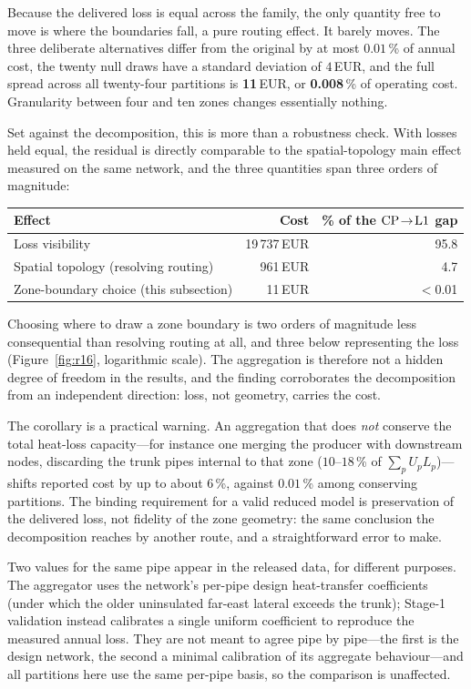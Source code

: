 Because the delivered loss is equal across the family, the only quantity free to move is
where the boundaries fall, a pure routing effect. It barely moves. The three deliberate
alternatives differ from the original by at most $0.01$\,\% of annual cost, the twenty null
draws have a standard deviation of $4$\,EUR, and the full spread across all twenty-four
partitions is \textbf{11}\,EUR, or \textbf{0.008}\,\% of operating cost. Granularity between
four and ten zones changes essentially nothing.

Set against the decomposition, this is more than a robustness check. With losses held
equal, the residual is directly comparable to the spatial-topology main effect measured on
the same network, and the three quantities span three orders of magnitude:

\begin{center}\footnotesize
\begin{tabular}{lrr}
\hline
Effect & Cost & \% of the $\mathrm{CP}\!\to\!\mathrm{L1}$ gap \\
\hline
Loss visibility & 19\,737\,EUR & 95.8 \\
Spatial topology (resolving routing) & 961\,EUR & 4.7 \\
Zone-boundary choice (this subsection) & 11\,EUR & $<$0.01 \\
\hline
\end{tabular}
\end{center}

Choosing where to draw a zone boundary is two orders of magnitude less consequential than
resolving routing at all, and three below representing the loss
(Figure~\ref{fig:r16}, logarithmic scale). The aggregation is therefore not a hidden degree
of freedom in the results, and the finding corroborates the decomposition from an
independent direction: loss, not geometry, carries the cost.

The corollary is a practical warning. An aggregation that does \emph{not} conserve the total
heat-loss capacity---for instance one merging the producer with downstream nodes, discarding
the trunk pipes internal to that zone ($10$--$18$\,\% of $\sum_p U_p L_p$)---shifts reported
cost by up to about $6$\,\%, against $0.01$\,\% among conserving partitions. The binding
requirement for a valid reduced model is preservation of the delivered loss, not fidelity of
the zone geometry: the same conclusion the decomposition reaches by another route, and a
straightforward error to make.

Two values for the same pipe appear in the released data, for different purposes. The
aggregator uses the network's per-pipe design heat-transfer coefficients (under which the
older uninsulated far-east lateral exceeds the trunk); Stage-1 validation instead calibrates
a single uniform coefficient to reproduce the measured annual loss. They are not meant to
agree pipe by pipe---the first is the design network, the second a minimal calibration of its
aggregate behaviour---and all partitions here use the same per-pipe basis, so the comparison
is unaffected.

